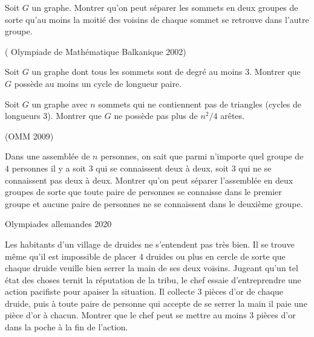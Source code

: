 \begin{exo}

Soit $G$ un graphe. Montrer qu’on peut séparer les sommets en deux groupes de sorte qu’au moins la moitié des voisins de chaque sommet se retrouve dans l’autre groupe.
\end{exo}


\begin{exo}

 ( Olympiade de Mathématique Balkanique 2002)

Soit $G$ un graphe dont tous les sommets sont de degré au moins $3$. Montrer que $G$ possède au moins un cycle de longueur paire.

\end{exo}



\begin{exo}

Soit $G$ un graphe avec $n$ sommets qui ne contiennent pas de triangles (cycles de longueurs $3$). Montrer que $G$ ne possède pas plus de $n^2/4$ arêtes.

\end{exo}


\begin{exo}
(OMM 2009)


Dans une assemblée de $n$ personnes, on sait que parmi n’importe quel groupe de $4$ personnes il y a soit $3$ qui se connaissent deux à deux, soit $3$ qui ne se connaissent pas deux à deux. Montrer qu’on peut séparer l’assemblée en deux groupes de sorte que toute paire de personnes se connaisse dans le premier groupe et aucune paire de personnes ne se connaissent dans le deuxième groupe.

\end{exo}


\begin{exo}
Olympiades allemandes 2020

Les habitants d’un village de druides ne s'entendent pas très bien. Il se trouve même qu'il est impossible de placer $4$ druides ou plus en cercle de sorte que chaque druide veuille bien serrer la main de ses deux voisins. Jugeant qu’un tel état des choses ternit la réputation de la tribu, le chef essaie d’entreprendre une action pacifiste pour apaiser la situation. Il collecte 3 pièces d’or de chaque druide, puis à toute paire de personne qui accepte de se serrer la main il paie une pièce d’or à chacun. Montrer que le chef peut se mettre au moins 3 pièces d’or dans la poche à la fin de l’action.

\end{exo}

